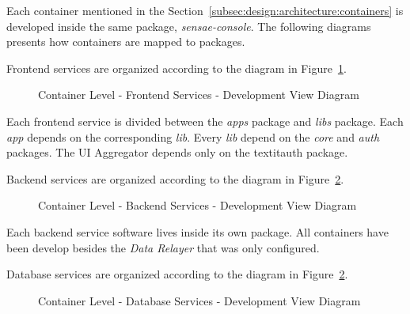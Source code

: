 Each container mentioned in the Section~\ref{subsec:design:architecture:containers} is developed inside the same package, \textit{sensae-console}. The following diagrams presents how containers are mapped to packages.

Frontend services are organized according to the diagram in Figure~\ref{fig:design:architecture:container:process:diagram:development:frontend}.

\begin{figure}[H]
   \centering
   \resizebox{\columnwidth}{!}
   {
      
   }
   \caption[Container Level - Frontend Services - Development View Diagram]{Container Level - Frontend Services - Development View Diagram}
   \label{fig:design:architecture:container:process:diagram:development:frontend}
\end{figure}

Each frontend service is divided between the \textit{apps} package and \textit{libs} package. Each \textit{app} depends on the corresponding \textit{lib}. Every \textit{lib} depend on the \textit{core} and \textit{auth} packages. The UI Aggregator depends only on the textit{auth} package.

Backend services are organized according to the diagram in Figure~\ref{fig:design:architecture:container:process:diagram:development:backend}.

\begin{figure}[H]
   \centering
   \resizebox{\columnwidth}{!}
   {
      
   }
   \caption[Container Level - Backend Services - Development View Diagram]{Container Level - Backend Services - Development View Diagram}
   \label{fig:design:architecture:container:process:diagram:development:backend}
\end{figure}

Each backend service software lives inside its own package. All containers have been develop besides the \textit{Data Relayer} that was only configured.

Database services are organized according to the diagram in Figure~\ref{fig:design:architecture:container:process:diagram:development:backend}.

\begin{figure}[H]
   \centering
   \resizebox{\columnwidth}{!}
   {
      
   }
   \caption[Container Level - Database Services - Development View Diagram]{Container Level - Database Services - Development View Diagram}
   \label{fig:design:architecture:container:process:diagram:development:database}
\end{figure}

